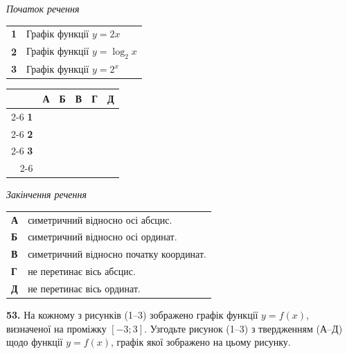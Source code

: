 \documentclass[14pt]{extarticle}
\newcommand{\answerGrid}{
    \begingroup
    \setlength{\tabcolsep}{4pt}
    \renewcommand{\arraystretch}{1.2}
    \small
    \begin{tabular}{r|c|c|c|c|c|}
         \multicolumn{1}{c}{} & \multicolumn{1}{c}{\textbf{А}} & \multicolumn{1}{c}{\textbf{Б}} & \multicolumn{1}{c}{\textbf{В}} & \multicolumn{1}{c}{\textbf{Г}} & \multicolumn{1}{c}{\textbf{Д}} \\ \cline{2-6}
         \textbf{1} & & & & & \\ \cline{2-6}
         \textbf{2} & & & & & \\ \cline{2-6}
         \textbf{3} & & & & & \\ \cline{2-6}
    \end{tabular}
    \endgroup
}
\begin{document}
\noindent
\begin{minipage}[t]{0.40\textwidth}
    \textit{Початок речення} \par \vspace{0.2cm}
    \begin{tabular}{@{}p{0.5cm} l@{}}
    \textbf{1} & Графік функції $y = 2x$ \\[0.4cm]
    \textbf{2} & Графік функції $y = \log_2 x$ \\[0.4cm]
    \textbf{3} & Графік функції \colorbox{yellow!30}{$y = 2^x$} \\
    \end{tabular}
    
    \vspace{0.3cm}
    \answerGrid
\end{minipage}%
\hfill
\begin{minipage}[t]{0.55\textwidth}
    \textit{Закінчення речення} \par \vspace{0.2cm}
    \begin{tabular}{@{}p{0.5cm} p{7.5cm}@{}}
    \textbf{А} & симетричний відносно осі абсцис. \\[0.2cm]
    \textbf{Б} & симетричний відносно осі ординат. \\[0.2cm]
    \textbf{В} & симетричний відносно початку координат. \\[0.2cm]
    \textbf{Г} & не перетинає вісь абсцис. \\[0.2cm]
    \textbf{Д} & не перетинає вісь ординат. \\
    \end{tabular}
\end{minipage}

\noindent\textbf{53.} На кожному з рисунків (1--3) зображено графік функції $y=f(x)$, визначеної на проміжку $[-3; 3]$. Узгодьте рисунок (1--3) з твердженням (А--Д) щодо функції $y=f(x)$, графік якої зображено на цьому рисунку.

\vspace{0.3cm}
\end{document}
